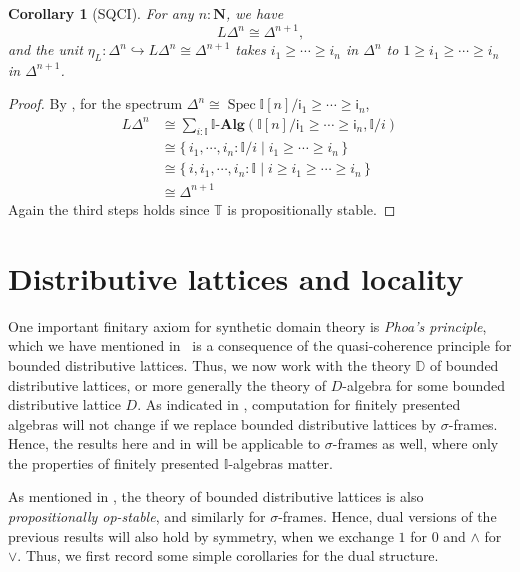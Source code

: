 \documentclass[a4paper,12pt]{amsart}
\newtheorem{corollary}[theorem]{Corollary}
\theoremstyle{definition}
\newcommand{\mb}[1]{\mathbf{#1}}
\newcommand{\mbb}[1]{\mathbb{#1}}
\newcommand{\T}{\mbb T}
\newcommand{\I}{\mbb I}
\newcommand{\ms}[1]{\mathsf{#1}}
\newcommand{\alg}{\text{-}\mb{Alg}}
\newcommand{\scomp}[2]{\{\,#1\mid#2\,\}}
\newcommand{\hook}{\hookrightarrow}
\newcommand{\N}{\mb N}
\newcommand{\spec}{\operatorname{Spec}}
\begin{document}

\begin{corollary}[SQCI]
  For any $n : \N$, we have
  \[ L\Delta^n \cong \Delta^{n+1}\text{,} \]
  and the unit $\eta_L \colon \Delta^n \hook L\Delta^n \cong \Delta^{n+1}$ takes $i_1 \ge \cdots \ge i_n$ in $\Delta^n$ to $1 \ge i_1 \ge \cdots \ge i_n$ in $\Delta^{n+1}$. 
\end{corollary}
\begin{proof}
  By , for the spectrum $\Delta^n \cong \spec\I[n]/\ms{i}_1 \ge \cdots \ge \ms{i}_n$,
  \begin{align*}
    L\Delta^n
    &\cong \sum_{i:\I}\I\alg(\I[n]/\ms{i}_1\ge\cdots\ge \ms{i}_n,\I/i) \\
    &\cong \scomp{i_1,\cdots,i_n:\I/i}{i_1 \ge \cdots \ge i_n} \\
    &\cong \scomp{i,i_1,\cdots,i_n:\I}{i \ge i_1 \ge \cdots \ge i_n} \\
    &\cong \Delta^{n+1}
  \end{align*}
  Again the third steps holds since $\T$ is propositionally stable.
\end{proof}

\section{Distributive lattices and locality}\label{sec:locality}

One important finitary axiom for synthetic domain theory is \emph{Phoa's principle}, which we have mentioned in~ is a consequence of the quasi-coherence principle for bounded distributive lattices. 
Thus, we now work with the theory $\mbb D$ of bounded distributive lattices, or more generally the theory of $D$-algebra for some bounded distributive lattice $D$. As indicated in , computation for finitely presented algebras 
will not change if we replace bounded distributive lattices by $\sigma$-frames. Hence, the results here and in  will be applicable to $\sigma$-frames as well, where only the properties of finitely presented $\I$-algebras matter.

As mentioned in , the theory of bounded distributive lattices is also \emph{propositionally op-stable}, and similarly for $\sigma$-frames. Hence, dual versions of the previous results will also hold by symmetry, when we exchange $1$ for $0$ and $\wedge$ for $\vee$. Thus, we first record some simple corollaries for the dual structure.
\end{document}
